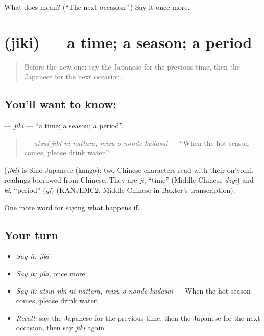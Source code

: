 \begin{tcolorbox}[breakable,colback=teal!4,colframe=teal!35!black,title={Before you move on}]
What does  mean? (\textquotedblleft{}The next occasion\textquotedblright{}.) Say it once more.
\end{tcolorbox}
\section[\texorpdfstring{\ja{じき} (jiki)}{じき (jiki)}]{ (jiki) — a time; a season; a period}

\label{lesson:JA-C346-jiki}



\begin{quote}
Before the new one: say the Japanese for the previous time, then the Japanese for the next occasion.
\end{quote}

\subsection*{You'll want to know: }
\textbf{} — \emph{jiki} — \textquotedblleft{}a time; a season; a period\textquotedblright{}.

\begin{quote}
\textbf{    } — \emph{atsui jiki ni nattara, mizu o nonde kudasai} — \textquotedblleft{}When the hot season comes, please drink water.\textquotedblright{}
\end{quote}

\begin{cousinweb}
\textbf{} (\emph{jiki}) is Sino-Japanese (kango): two Chinese characters read with their on'yomi, readings borrowed from Chinese. They are \emph{ji}, \textquotedblleft{}time\textquotedblright{} (Middle Chinese \emph{dzyi}) and \emph{ki}, \textquotedblleft{}period\textquotedblright{} (\emph{gi}) (KANJIDIC2; Middle Chinese in Baxter's transcription).
\end{cousinweb}

\begin{grammarlens}[title={What you've built}]
One more word for saying what happens if.
\end{grammarlens}

\subsection*{Your turn}
\begin{itemize}
\raggedright
  \item \emph{Say it:} \emph{jiki}
  \item \emph{Say it:} \emph{jiki}, once more
  \item \emph{Say it:} \emph{atsui jiki ni nattara, mizu o nonde kudasai} — When the hot season comes, please drink water.
  \item \emph{Recall:} say the Japanese for the previous time, then the Japanese for the next occasion, then say \emph{jiki} again
\end{itemize}

